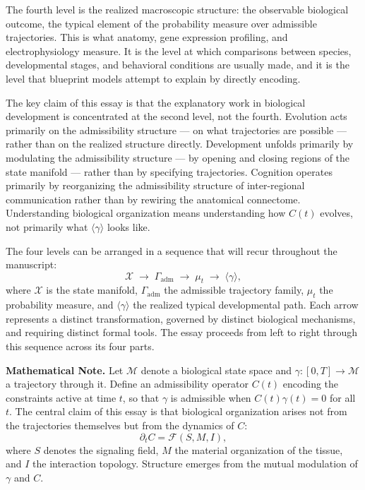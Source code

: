 \documentclass[12pt, a4paper, openany]{book}
\theoremstyle{definition}
\theoremstyle{remark}
\begin{document}
The fourth level is the realized macroscopic structure: the observable biological outcome, the typical element of the probability measure over admissible trajectories. This is what anatomy, gene expression profiling, and electrophysiology measure. It is the level at which comparisons between species, developmental stages, and behavioral conditions are usually made, and it is the level that blueprint models attempt to explain by directly encoding.

The key claim of this essay is that the explanatory work in biological development is concentrated at the second level, not the fourth. Evolution acts primarily on the admissibility structure — on what trajectories are possible — rather than on the realized structure directly. Development unfolds primarily by modulating the admissibility structure — by opening and closing regions of the state manifold — rather than by specifying trajectories. Cognition operates primarily by reorganizing the admissibility structure of inter-regional communication rather than by rewiring the anatomical connectome. Understanding biological organization means understanding how $C(t)$ evolves, not primarily what $\langle\gamma\rangle$ looks like.

The four levels can be arranged in a sequence that will recur throughout the manuscript:
\begin{equation}
\mathcal{X} \;\longrightarrow\; \Gamma_{\mathrm{adm}} \;\longrightarrow\; \mu_t \;\longrightarrow\; \langle \gamma \rangle,
\end{equation}
where $\mathcal{X}$ is the state manifold, $\Gamma_{\mathrm{adm}}$ the admissible trajectory family, $\mu_t$ the probability measure, and $\langle\gamma\rangle$ the realized typical developmental path. Each arrow represents a distinct transformation, governed by distinct biological mechanisms, and requiring distinct formal tools. The essay proceeds from left to right through this sequence across its four parts.

\vspace{1.5em}
\noindent\textbf{Mathematical Note.} Let $\mathcal{M}$ denote a biological state space and $\gamma : [0,T] \to \mathcal{M}$ a trajectory through it. Define an admissibility operator $C(t)$ encoding the constraints active at time $t$, so that $\gamma$ is admissible when $C(t)\gamma(t) = 0$ for all $t$. The central claim of this essay is that biological organization arises not from the trajectories themselves but from the dynamics of $C$:
\begin{equation}
\partial_t C = \mathcal{F}(S, M, I),
\end{equation}
where $S$ denotes the signaling field, $M$ the material organization of the tissue, and $I$ the interaction topology. Structure emerges from the mutual modulation of $\gamma$ and $C$.
\end{document}
